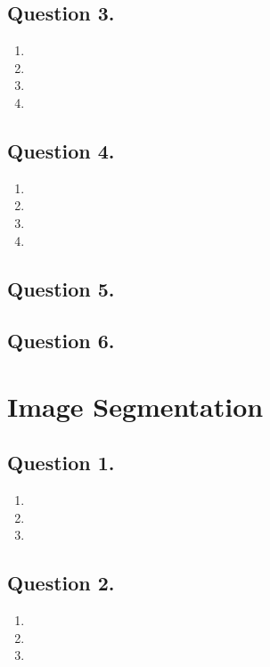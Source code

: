 \documentclass[10pt]{article}
\begin{document}
    \subsection*{\textbf{Question 3.}}
    \begin{enumerate}[label=(\alph*)]
        \item
        \item
        \item
        \item
    \end{enumerate}

    \subsection*{\textbf{Question 4.}}
    \begin{enumerate}[label=(\alph*)]
        \item
        \item
        \item
        \item
    \end{enumerate}

    \subsection*{\textbf{Question 5.}}

    \subsection*{\textbf{Question 6.}}

    \section*{\textbf{Image Segmentation}}

    \subsection*{\textbf{Question 1.}}
    \begin{enumerate}[label=(\alph*)]
        \item
        \item
        \item
    \end{enumerate}

    \subsection*{\textbf{Question 2.}}
    \begin{enumerate}[label=(\alph*)]
        \item
        \item
        \item
    \end{enumerate}
\end{document}
